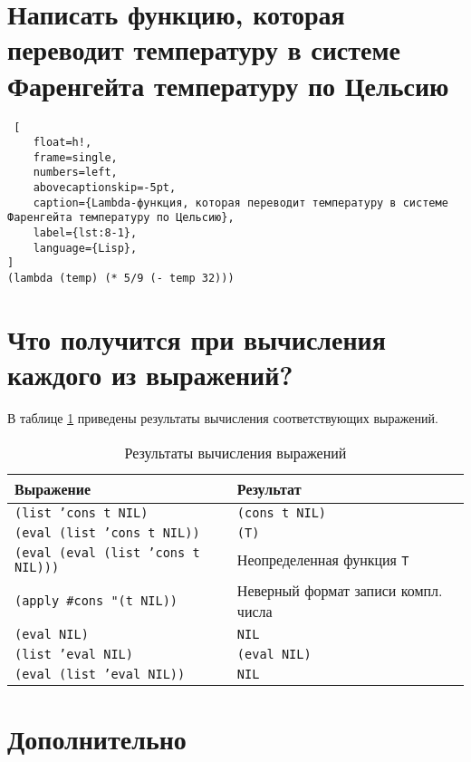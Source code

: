 \section{Написать функцию, которая переводит температуру в системе Фаренгейта температуру по Цельсию}

\begin{lstlisting} [
	float=h!,
	frame=single,
	numbers=left,
	abovecaptionskip=-5pt,
	caption={Lambda-функция, которая переводит температуру в системе Фаренгейта температуру по Цельсию},
	label={lst:8-1},
	language={Lisp},
]
(lambda (temp) (* 5/9 (- temp 32)))
\end{lstlisting}

\section{Что получится при вычисления каждого из выражений?}

В таблице \ref{tbl:9-1} приведены результаты вычисления соответствующих выражений.

\begin{table}[!ht]
    \small
	\begin{center}
		\caption{Результаты вычисления выражений}
		\label{tbl:9-1}
		\begin{tabular}{|l|l|}
			\hline
			\bfseries Выражение & \bfseries Результат \\\hline
            \texttt{(list 'cons t NIL)} & \texttt{(cons t NIL)} \\\hline
            \texttt{(eval (list 'cons t NIL))} & \texttt{(T)} \\\hline
            \texttt{(eval (eval (list 'cons t NIL)))} & Неопределенная функция \texttt{T} \\\hline
            \texttt{(apply \#cons "(t NIL))} & Неверный формат записи компл. числа \\\hline
            \texttt{(eval NIL)} & \texttt{NIL} \\\hline
            \texttt{(list 'eval NIL) } & \texttt{(eval NIL)} \\\hline
            \texttt{(eval (list 'eval NIL))} & \texttt{NIL} \\\hline
		\end{tabular}
	\end{center}
\end{table}

\clearpage

\section{Дополнительно}

